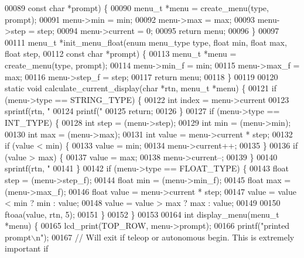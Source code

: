 \begin{DoxyCode}
{00089                       \textcolor{keyword}{const} \textcolor{keywordtype}{char} *prompt) \{
00090   menu_t *menu = create_menu(type, prompt);
00091   menu->min = min;
00092   menu->max = max;
00093   menu->step = step;
00094   menu->current = 0;
00095   \textcolor{keywordflow}{return} menu;
00096 \}
00097 
00111 menu_t *init_menu_float(\textcolor{keyword}{enum} menu_type type, \textcolor{keywordtype}{float} min, \textcolor{keywordtype}{float} max, \textcolor{keywordtype}{float} step,
00112                         \textcolor{keyword}{const} \textcolor{keywordtype}{char} *prompt) \{
00113   menu_t *menu = create_menu(type, prompt);
00114   menu->min_f = min;
00115   menu->max_f = max;
00116   menu->step_f = step;
00117   \textcolor{keywordflow}{return} menu;
00118 \}
00119 
00120 \textcolor{keyword}{static} \textcolor{keywordtype}{void} calculate_current_display(\textcolor{keywordtype}{char} *rtn, menu_t *menu) \{
00121   \textcolor{keywordflow}{if} (menu->type == STRING_TYPE) \{
00122     \textcolor{keywordtype}{int} index = menu->current %
00123     sprintf(rtn, \textcolor{stringliteral}{"%
00124     printf(\textcolor{stringliteral}{"%
00125     \textcolor{keywordflow}{return};
00126   \}
00127   \textcolor{keywordflow}{if} (menu->type == INT_TYPE) \{
00128     \textcolor{keywordtype}{int} step = (menu->step);
00129     \textcolor{keywordtype}{int} min = (menu->min);
00130     \textcolor{keywordtype}{int} max = (menu->max);
00131     \textcolor{keywordtype}{int} value = menu->current * step;
00132     \textcolor{keywordflow}{if} (value < min) \{
00133       value = min;
00134       menu->current++;
00135     \}
00136     \textcolor{keywordflow}{if} (value > max) \{
00137       value = max;
00138       menu->current--;
00139     \}
00140     sprintf(rtn, \textcolor{stringliteral}{"%
00141   \}
00142   \textcolor{keywordflow}{if} (menu->type == FLOAT_TYPE) \{
00143     \textcolor{keywordtype}{float} step = (menu->step_f);
00144     \textcolor{keywordtype}{float} min = (menu->min_f);
00145     \textcolor{keywordtype}{float} max = (menu->max_f);
00146     \textcolor{keywordtype}{float} value = menu->current * step;
00147     value = value < min ? min : value;
00148     value = value > max ? max : value;
00149 
00150     ftoaa(value, rtn, 5);
00151   \}
00152 \}
00153 
00164 \textcolor{keywordtype}{int} display_menu(menu_t *menu) \{
00165   lcd_print(TOP\_ROW, menu->prompt);
00166   printf(\textcolor{stringliteral}{"printed prompt\(\backslash\)n"});
00167   \textcolor{comment}{// Will exit if teleop or autonomous begin. This is extremely important if}
}}}}
\end{DoxyCode}
